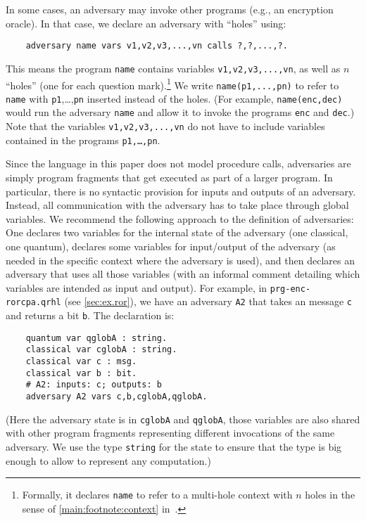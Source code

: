 \documentclass{article}
\makeatletter
\newcommand\toolidx[1]{\index{#1@\textttOLD{#1} (tool command)}}
\newcommand\qrhlautoref[1]{\autoref*{main:#1} in~\cite{qrhl-paper-from-manual}}
\makeatother
\begin{document}
In some cases, an adversary may invoke other programs (e.g., an encryption oracle).
In that case, we declare an adversary with ``holes'' using:
\begin{center}
  \toolidx{adversary}
  \begin{lstlisting}
    adversary name vars v1,v2,v3,...,vn calls ?,?,...,?.
  \end{lstlisting}
\end{center}
This means the program \texttt{name} contains variables \texttt{v1,v2,v3,...,vn},
as well as $n$ ``holes'' (one for each question mark).\footnote{Formally,
  it declares \texttt{name} to refer to a multi-hole context with $n$ holes in the sense of
  \qrhlautoref{footnote:context}.}
We write \texttt{name(p1,...,pn)} to refer to \texttt{name} with \texttt{p1},\dots,\texttt{pn}
inserted instead of the holes.
(For example, \texttt{name(enc,dec)} would run the adversary \texttt{name} and allow it to invoke the
programs \texttt{enc} and \texttt{dec}.)
Note that the variables \texttt{v1,v2,v3,...,vn} do not have to include variables contained
in the programs \texttt{p1,\dots,pn}.

Since the language in this paper does not model procedure calls,
adversaries are simply program fragments that get executed as part of
a larger program. In particular, there is no syntactic provision for
inputs and outputs of an adversary. Instead, all communication with
the adversary has to take place through global variables. We recommend
the following approach to the definition of adversaries: One declares
two variables for the internal state of the adversary (one classical,
one quantum), declares some variables for input/output of the
adversary (as needed in the specific context where the adversary is
used), and then declares an adversary that uses all those variables
(with an informal comment detailing which variables are intended as input and
output). For example, in \texttt{prg-enc-rorcpa.qrhl} (see \autoref{sec:ex.ror}), we have an
adversary \texttt{A2} that takes an message \texttt{c} and returns
a bit \texttt{b}. The declaration is:
\begin{center}
  \begin{lstlisting}
    quantum var qglobA : string.
    classical var cglobA : string.
    classical var c : msg.
    classical var b : bit.
    # A2: inputs: c; outputs: b
    adversary A2 vars c,b,cglobA,qglobA.
  \end{lstlisting}
\end{center}
(Here the adversary state is in \texttt{cglobA} and \texttt{qglobA},
those variables are also shared with other program fragments
representing different invocations of the same adversary. We use the
type \texttt{string} for the state to ensure that the type is big enough to allow to represent any computation.)
\end{document}
